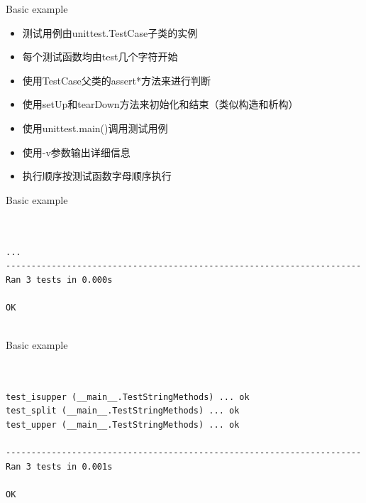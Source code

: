 \documentclass{beamer}
\begin{document}
\begin{frame}[t]{Basic example}

    \begin{itemize}
        \item 测试用例由unittest.TestCase子类的实例
        \item 每个测试函数均由test几个字符开始
        \item 使用TestCase父类的assert*方法来进行判断
        \item 使用setUp和tearDown方法来初始化和结束（类似构造和析构）
        \item 使用unittest.main()调用测试用例
        \item 使用-v参数输出详细信息
        \item 执行顺序按测试函数字母顺序执行
    \end{itemize}

\end{frame}



\begin{frame}[t,fragile]{Basic example}


\begin{verbatim}


...
----------------------------------------------------------------------
Ran 3 tests in 0.000s

OK


\end{verbatim}


\end{frame}



\begin{frame}[t,fragile]{Basic example}


\begin{verbatim}


test_isupper (__main__.TestStringMethods) ... ok
test_split (__main__.TestStringMethods) ... ok
test_upper (__main__.TestStringMethods) ... ok

----------------------------------------------------------------------
Ran 3 tests in 0.001s

OK


\end{verbatim}


\end{frame}
\end{document}

